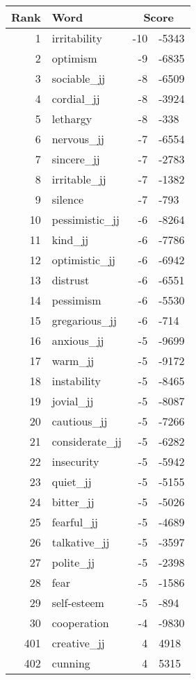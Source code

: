 \begin{longtable}[!htbp]{| rlr@{.}l |}
    \hline
    \textbf{Rank} & \textbf{Word} & \multicolumn{2}{c|}{\textbf{Score}} \\
    \hline
    \endhead
    1 & irritability & -10 & -5343 \\
    2 & optimism & -9 & -6835 \\
    3 & sociable\_jj & -8 & -6509 \\
    4 & cordial\_jj & -8 & -3924 \\
    5 & lethargy & -8 & -338 \\
    6 & nervous\_jj & -7 & -6554 \\
    7 & sincere\_jj & -7 & -2783 \\
    8 & irritable\_jj & -7 & -1382 \\
    9 & silence & -7 & -793 \\
    10 & pessimistic\_jj & -6 & -8264 \\
    11 & kind\_jj & -6 & -7786 \\
    12 & optimistic\_jj & -6 & -6942 \\
    13 & distrust & -6 & -6551 \\
    14 & pessimism & -6 & -5530 \\
    15 & gregarious\_jj & -6 & -714 \\
    16 & anxious\_jj & -5 & -9699 \\
    17 & warm\_jj & -5 & -9172 \\
    18 & instability & -5 & -8465 \\
    19 & jovial\_jj & -5 & -8087 \\
    20 & cautious\_jj & -5 & -7266 \\
    21 & considerate\_jj & -5 & -6282 \\
    22 & insecurity & -5 & -5942 \\
    23 & quiet\_jj & -5 & -5155 \\
    24 & bitter\_jj & -5 & -5026 \\
    25 & fearful\_jj & -5 & -4689 \\
    26 & talkative\_jj & -5 & -3597 \\
    27 & polite\_jj & -5 & -2398 \\
    28 & fear & -5 & -1586 \\
    29 & self-esteem & -5 & -894 \\
    30 & cooperation & -4 & -9830 \\
    401 & creative\_jj & 4 & 4918 \\
    402 & cunning & 4 & 5315 \\

\end{longtable}
